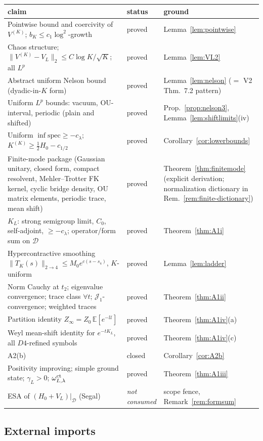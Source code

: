 \documentclass[11pt,a4paper]{article}
\theoremstyle{plain}
\theoremstyle{definition}
\newcommand{\E}{\mathbb{E}}
\newcommand{\U}{\mathcal U}
\newcommand{\D}{\mathcal D}
\newcommand{\Jone}{\mathcal J_1}
\begin{document}
\begin{longtable}{P{5.9cm}P{2.2cm}P{5.7cm}}
\toprule
claim & status & ground \\
\midrule
\endhead
Pointwise bound and coercivity of $V^{(K)}$; $b_K\le c_1\log^2$-growth &
proved & Lemma~\ref{lem:pointwise} \\
Chaos structure; $\|V^{(K)}-V_L\|_2\le C\log K/\sqrt K$; all $L^p$ &
proved & Lemma~\ref{lem:VL2} \\
Abstract uniform Nelson bound (dyadic-in-$K$ form) & proved &
Lemma~\ref{lem:nelson} ($=$ V2 Thm.\ 7.2 pattern) \\
Uniform $L^p$ bounds: vacuum, OU-interval, periodic (plain and shifted) &
proved & Prop.~\ref{prop:nelson3}, Lemma~\ref{lem:shiftlimits}(iv) \\
Uniform $\inf\mathrm{spec}\ge-c_\lambda$; $K^{(K)}\ge\tfrac12H_0-c_{1/2}$
& proved & Corollary~\ref{cor:lowerbounds} \\
Finite-mode package (Gaussian unitary, closed form, compact resolvent,
Mehler--Trotter FK kernel, cyclic bridge density, OU matrix elements,
periodic trace, mean shift) & proved &
Theorem~\ref{thm:finitemode} (explicit derivation; normalization dictionary
in Rem.~\ref{rem:finite-dictionary}) \\
$K_L$: strong semigroup limit, $C_0$, self-adjoint, $\ge-c_\lambda$;
operator/form sum on $\D$ & proved & Theorem~\ref{thm:A1i} \\
Hypercontractive smoothing $\|T_K(s)\|_{2\to4}\le M_0e^{c(s-s_4)}$,
$K$-uniform & proved & Lemma~\ref{lem:ladder} \\
Norm Cauchy at $t_2$; eigenvalue convergence; trace class $\forall t$;
$\Jone$-convergence; weighted traces & proved & Theorem~\ref{thm:A1ii} \\
Partition identity $Z_\infty=Z_0\,\E[e^{-\U}]$ & proved &
Theorem~\ref{thm:A1iv}(a) \\
Weyl mean-shift identity for $e^{-tK_L}$, all $D4$-refined symbols &
proved & Theorem~\ref{thm:A1iv}(c) \\
A2(b) & closed & Corollary~\ref{cor:A2b} \\
Positivity improving; simple ground state; $\gamma_L>0$;
$\omega^{\rm ct}_{L,\lambda}$ & proved & Theorem~\ref{thm:A1iii} \\
ESA of $(H_0+V_L)|_\D$ (Segal) & \emph{not consumed} & scope fence,
Remark~\ref{rem:formsum} \\
\bottomrule
\end{longtable}

\subsection*{External imports}
\end{document}
